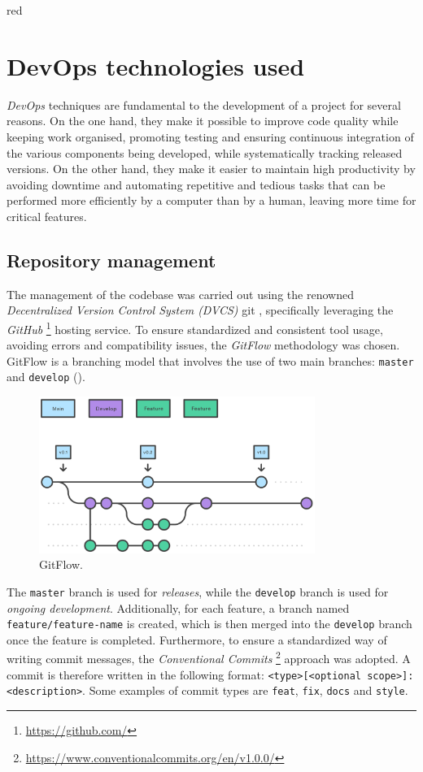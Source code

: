 \documentclass[12pt,a4paper,openright,twoside]{book}
\begin{document}
\begin{color}{red}
\section{DevOps technologies used}
\end{color}

\emph{DevOps} techniques are fundamental to the development of a project for several reasons. On the one hand, 
    they make it possible to improve code quality while keeping work organised, promoting testing and 
    ensuring continuous integration of the various components being developed, while systematically 
    tracking released versions. On the other hand, they make it easier to maintain high productivity 
    by avoiding downtime and automating repetitive and tedious tasks that can be performed more efficiently 
    by a computer than by a human, leaving more time for critical features.

\subsection*{Repository management}
The management of the codebase was carried out using the renowned \emph{Decentralized Version Control System (DVCS)} git \cite{spinellis2012git}, 
    specifically leveraging the \emph{GitHub} \footnote{\url{https://github.com/}} hosting service. To ensure standardized and consistent tool usage, 
    avoiding errors and compatibility issues, the \emph{GitFlow} methodology was chosen.
    GitFlow is a branching model that involves the use of two main branches: \texttt{master} and \texttt{develop} ().
    \begin{figure}[t]
        \centering
        \includegraphics[width=0.8\textwidth]{figures/gitflow.png}
        \caption{GitFlow.}
        \label{fig:gitflow}
    \end{figure}
    The \texttt{master} branch is used for \emph{releases}, while the \texttt{develop} branch is used for \emph{ongoing development}. 
    Additionally, for each feature, a branch named \texttt{feature/feature-name} is created, which is then merged 
    into the \texttt{develop} branch once the feature is completed.
    Furthermore, to ensure a standardized way of writing commit messages, 
        the \emph{Conventional Commits} \footnote{\url{https://www.conventionalcommits.org/en/v1.0.0/}} 
        approach was adopted. A commit is therefore written in the following format: \texttt{<type>[<optional scope>]: <description>}.
        Some examples of commit types are \texttt{feat}, \texttt{fix}, \texttt{docs} and \texttt{style}.
\end{document}
